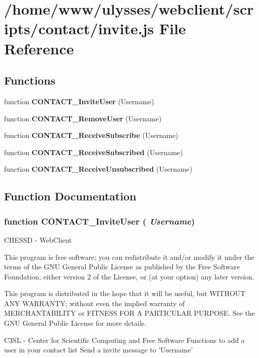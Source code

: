 \section{/home/www/ulysses/webclient/scripts/contact/invite.js File Reference}
\label{invite_8js}
\subsection*{Functions}
\begin{CompactItemize}
\item 
function {\bf CONTACT\_\-InviteUser} (Username)
\item 
function {\bf CONTACT\_\-RemoveUser} (Username)
\item 
function {\bf CONTACT\_\-ReceiveSubscribe} (Username)
\item 
function {\bf CONTACT\_\-ReceiveSubscribed} (Username)
\item 
function {\bf CONTACT\_\-ReceiveUnsubscribed} (Username)
\end{CompactItemize}


\subsection{Function Documentation}
\subsubsection{\setlength{\rightskip}{0pt plus 5cm}function CONTACT\_\-InviteUser ( {\em Username})}\label{invite_8js_87665c122ac1865b648f6c897cdaa6ab}


CHESSD - WebClient

This program is free software; you can redistribute it and/or modify it under the terms of the GNU General Public License as published by the Free Software Foundation; either version 2 of the License, or (at your option) any later version.

This program is distributed in the hope that it will be useful, but WITHOUT ANY WARRANTY; without even the implied warranty of MERCHANTABILITY or FITNESS FOR A PARTICULAR PURPOSE. See the GNU General Public License for more details.

C3SL - Center for Scientific Computing and Free Software Functions to add a user in your contact list Send a invite message to 'Username' 

